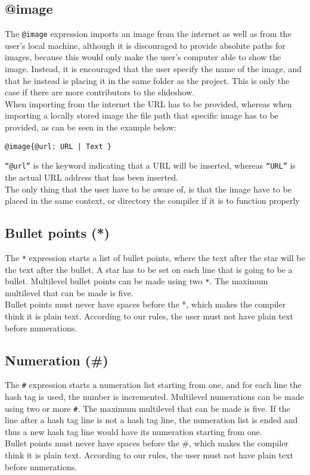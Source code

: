 \subsection{@image}
The \texttt{@image} expression imports an image from the internet as well as from the user's local machine, although it is discouraged to provide absolute paths for images, because this would only make the user's computer able to show the image. Instead, it is encouraged that the user specify the name of the image, and that he instead is placing it in the same folder as the project. This is only the case if there are more contributors to the slideshow.\\
When importing from the internet the URL has to be provided, whereas when importing a locally stored image the file path that specific image has to be provided, as can be seen in the example below:
\begin{lstlisting}[frame=single]
@image{@url: URL | Text }
\end{lstlisting}
\texttt{``@url''} is the keyword indicating that a URL will be inserted, whereas \texttt{``URL''} is the actual URL address that has been inserted. \\
The only thing that the user have to be aware of, is that the image have to be placed in the same context, or directory the compiler if it is to function properly

\subsection{Bullet points (*)}
The \texttt{*} expression starts a list of bullet points, where the text after the star will be the text after the bullet.
A star has to be set on each line that is going to be a bullet. Multilevel bullet points can be made using two \texttt{*}. The maximum multilevel that can be made is five. \\
Bullet points must never have spaces before the *, which makes the compiler think it is plain text. According to our rules, the user must not have plain text before numerations.

\subsection{Numeration (\#)}
The \texttt{\#} expression starts a numeration list starting from one, and for each line the hash tag is used, the number is incremented. Multilevel numerations can be made using two or more \texttt{#}. The maximum multilevel that can be made is five. If the line after a hash tag line is not a hash tag line, the numeration list is ended and thus a new hash tag line would have its numeration starting from one. \\
Bullet points must never have spaces before the \#, which makes the compiler think it is plain text. According to our rules, the user must not have plain text before numerations.

